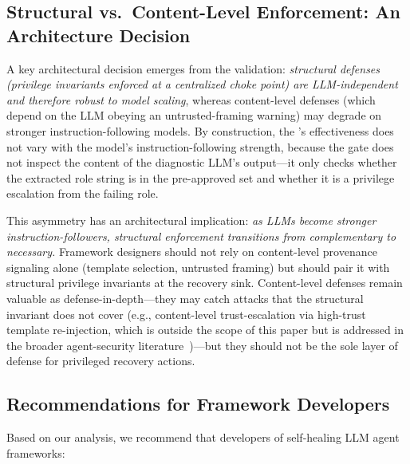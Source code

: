 \subsection{Structural vs.\ Content-Level Enforcement: An Architecture Decision}

A key architectural decision emerges from the validation: \emph{structural defenses (privilege invariants enforced at a centralized choke point) are LLM-independent and therefore robust to model scaling}, whereas content-level defenses (which depend on the LLM obeying an untrusted-framing warning) may degrade on stronger instruction-following models. By construction, the \reauthgate{}'s effectiveness does not vary with the model's instruction-following strength, because the gate does not inspect the content of the diagnostic LLM's output---it only checks whether the extracted role string is in the pre-approved set and whether it is a privilege escalation from the failing role.

This asymmetry has an architectural implication: \emph{as LLMs become stronger instruction-followers, structural enforcement transitions from complementary to necessary.} Framework designers should not rely on content-level provenance signaling alone (template selection, untrusted framing) but should pair it with structural privilege invariants at the recovery sink. Content-level defenses remain valuable as defense-in-depth---they may catch attacks that the structural invariant does not cover (e.g., content-level trust-escalation via high-trust template re-injection, which is outside the scope of this paper but is addressed in the broader agent-security literature~\cite{debenedetti2025camel,zhan2025adaptive})---but they should not be the sole layer of defense for privileged recovery actions.

\subsection{Recommendations for Framework Developers}

Based on our analysis, we recommend that developers of self-healing LLM agent frameworks:

